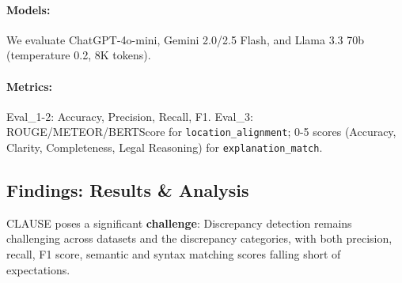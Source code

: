 \documentclass[11pt]{article}
\newcommand{\datasetName}{{\sc CLAUSE}\xspace}
\begin{document}
\paragraph{Models:} We evaluate ChatGPT-4o-mini, Gemini 2.0/2.5 Flash, and Llama 3.3 70b (temperature 0.2, 8K tokens).

\paragraph{Metrics:} Eval\_1-2: Accuracy, Precision, Recall, F1. Eval\_3: ROUGE/METEOR/BERTScore for \texttt{location\_alignment}; 0-5 scores (Accuracy, Clarity, Completeness, Legal Reasoning) for \texttt{explanation\_match}. 


\subsection{Findings: Results \& Analysis}
\datasetName poses a significant \textbf{challenge}: Discrepancy detection remains challenging across datasets and the discrepancy categories, with both precision, recall, F1 score, semantic and syntax matching scores falling short of expectations. 
\end{document}
